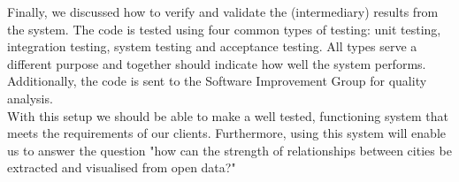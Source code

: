 Finally, we discussed how to verify and validate the (intermediary) results from the system. The code is tested using four common types of testing: unit testing, integration testing, system testing and acceptance testing. All types serve a different purpose and together should indicate how well the system performs. Additionally, the code is sent to the Software Improvement Group for quality analysis.
\\

With this setup we should be able to make a well tested, functioning system that meets the requirements of our clients. Furthermore, using this system will enable us to answer the question "how can the strength of relationships between cities be extracted and visualised from open data?" 

